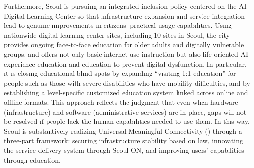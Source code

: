 Furthermore, Seoul is pursuing an integrated inclusion policy centered on the AI Digital Learning Center so that infrastructure expansion and service integration lead to genuine improvements in citizens' practical usage capabilities. Using nationwide digital learning center sites, including 10 sites in Seoul, the city provides ongoing face-to-face education for older adults and digitally vulnerable groups, and offers not only basic internet-use instruction but also life-oriented AI experience education and education to prevent digital dysfunction. In particular, it is closing educational blind spots by expanding \enquote{visiting 1:1 education} for people such as those with severe disabilities who have mobility difficulties, and by establishing a level-specific customized education system linked across online and offline formats. This approach reflects the judgment that even when hardware (infrastructure) and software (administrative services) are in place, gaps will not be resolved if people lack the human capabilities needed to use them. In this way, Seoul is substantively realizing Universal Meaningful Connectivity (\umc{}) through a three-part framework: securing infrastructure stability based on law, innovating the service delivery system through Seoul ON, and improving users' capabilities through education.
